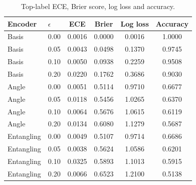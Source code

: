 \begin{table}[htbp]
\centering
\small
\caption{Top-label ECE, Brier score, log loss and accuracy.}
\label{tab:calibration}
\begin{tabular}{llcccc}
\toprule
Encoder & $\epsilon$ & ECE & Brier & Log loss & Accuracy \\
\midrule
Basis & 0.00 & 0.0016 & 0.0000 & 0.0016 & 1.0000 \\
Basis & 0.05 & 0.0043 & 0.0498 & 0.1370 & 0.9745 \\
Basis & 0.10 & 0.0050 & 0.0938 & 0.2259 & 0.9508 \\
Basis & 0.20 & 0.0220 & 0.1762 & 0.3686 & 0.9030 \\
\midrule
Angle & 0.00 & 0.0051 & 0.5114 & 0.9710 & 0.6677 \\
Angle & 0.05 & 0.0118 & 0.5456 & 1.0265 & 0.6370 \\
Angle & 0.10 & 0.0064 & 0.5676 & 1.0615 & 0.6119 \\
Angle & 0.20 & 0.0134 & 0.6080 & 1.1279 & 0.5687 \\
\midrule
Entangling & 0.00 & 0.0049 & 0.5107 & 0.9714 & 0.6686 \\
Entangling & 0.05 & 0.0038 & 0.5624 & 1.0586 & 0.6201 \\
Entangling & 0.10 & 0.0325 & 0.5893 & 1.1013 & 0.5915 \\
Entangling & 0.20 & 0.0066 & 0.6523 & 1.2100 & 0.5138 \\
\bottomrule
\end{tabular}
\end{table}

